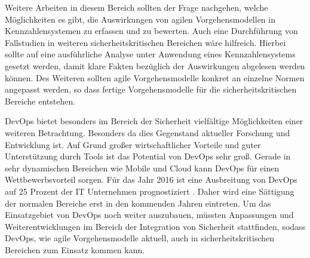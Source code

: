 Weitere Arbeiten in diesem Bereich sollten der Frage nachgehen, welche Möglichkeiten es gibt, die Auswirkungen von agilen Vorgehensmodellen in Kennzahlensystemen zu erfassen und zu bewerten.
Auch eine Durchführung von Fallstudien in weiteren sicherheitskritischen Bereichen wäre hilfreich. 
Hierbei sollte auf eine ausführliche Analyse unter Anwendung eines Kennzahlensystems gesetzt werden, damit klare Fakten bezüglich der Auswirkungen abgelesen werden können.
Des Weiteren sollten agile Vorgehensmodelle konkret an einzelne Normen angepasst werden, so dass fertige Vorgehensmodelle für die sicherheitskritischen Bereiche entstehen.

DevOps bietet besonders im Bereich der Sicherheit vielfältige Möglichkeiten einer weiteren Betrachtung. 
Besonders da dies Gegenstand aktueller Forschung und Entwicklung ist. 
Auf Grund großer wirtschaftlicher Vorteile und guter Unterstützung durch Tools ist das Potential von DevOps sehr groß. 
Gerade in sehr dynamischen Bereichen wie Mobile und Cloud kann DevOps für einen Wettbewerbsvorteil sorgen. 
Für das Jahr 2016 ist eine Ausbreitung von DevOps auf 25 Prozent der IT Unternehmen prognostiziert \parencite[vgl.][]{Gartner:2015}. 
Daher wird eine Sättigung der normalen Bereiche erst in den kommenden Jahren eintreten.
Um das Einsatzgebiet von DevOps noch weiter auszubauen, müssten Anpassungen und Weiterentwicklungen im Bereich der Integration von Sicherheit stattfinden, sodass DevOps, wie agile Vorgehensmodelle aktuell, auch in sicherheitskritischen Bereichen zum Einsatz kommen kann.
 
